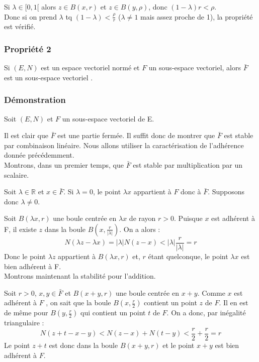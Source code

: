 \documentclass[a4paper, oneside]{report}
\newcommand{\R}{\mathbb{R}}
\newcommand{\sev}{sous-espace vectoriel }
\newcommand{\ev}{espace vectoriel }
\begin{document}
Si $\lambda \in [0,1[$ alors $z\in B(x,r)$ et $z\in B(y,\rho)$, donc $(1-\lambda)r <\rho$.\\
Donc si on prend $\lambda$ tq $(1-\lambda) < \frac{\rho}{r}$ ($\lambda \neq 1$ mais assez proche de 1), la propriété est vérifié.

\subsubsection{Propriété 2}

Si $(E,N)$ est un \ev normé et $F$ un sous-espace vectoriel, alors $\bar{F}$ est un \sev.

\subsubsection{Démonstration}

Soit $(E,N)$ et $F$ un \sev de E. 

Il est clair que $\bar{F}$ est une partie fermée. Il suffit donc de montrer que $\bar{F}$ est stable par combinaison linéaire. Nous allons utiliser la caractérisation de l'adhérence donnée précédemment. \\

Montrons, dans un premier temps, que $\bar{F}$ est stable par multiplication par un scalaire. 

Soit $\lambda \in \R$ et $x \in \bar{F}$. Si $\lambda = 0$, le point $\lambda x$ appartient à $F$ donc à $\bar{F}$. Supposons donc $\lambda \neq 0$.

Soit $B(\lambda x, r)$ une boule centrée en $\lambda x$ de rayon $r > 0$. Puisque $x$ est adhérent à F, il existe $z$ dans la boule $B(x,\frac{r}{|\lambda|})$. On a alors :
$$N(\lambda z - \lambda x) = |\lambda|N(z-x) < |\lambda|\frac{r}{|\lambda|} = r$$
Donc le point $\lambda z$ appartient à $B(\lambda x, r)$ et, $r$ étant quelconque, le point $\lambda x$ est bien adhérent à F. \\

Montrons maintenant la stabilité pour l'addition.

Soit $r>0$, $x,y\in \bar{F}$ et $B(x+y,r)$ une boule centrée en $x + y$. Comme $x$ est adhérent à $F$ , on sait que
la boule $B(x, \frac{r}{2})$ contient un point $z$ de $F$. Il en est de même pour $B(y, \frac{r}{2})$ qui contient un point $t$ de $F$. On a donc, par inégalité triangulaire : $$N(z+t-x-y)< N(z-x)+N(t-y)<\frac{r}{2} + \frac{r}{2} = r$$
Le point $z + t$ est donc dans la boule $B(x + y, r)$ et le point $x + y$ est bien adhérent à $F$.\\
\end{document}
